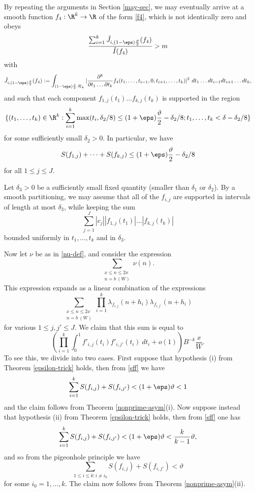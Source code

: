 By repeating the arguments in Section \ref{may-sec}, we may eventually arrive at a smooth function $f_4: \R^k \to \R$ of the form \eqref{f4}, which is not identically zero and obeys 
\begin{equation}\label{f4-ratio}
\frac{\sum_{i=1}^k \tilde J_{i,(1-\eps) \frac{\vartheta}{2}}(f_4)}{\tilde I(f_4)} > m
\end{equation}
with
$$ \tilde J_{i, (1-\eps) \frac{\vartheta}{2}}(f_4) := \int_{(1-\eps) \frac{\vartheta}{2} \cdot {\mathcal R}_k} |\frac{\partial^k}{\partial t_1 \dots \partial t_k} f_4(t_1,\dots,t_{i-1}, 0, t_{i+1}, \dots, t_k)|^2\ dt_1 \dots dt_{i-1} dt_{i+1} \dots dt_k,$$
and such that each component $f_{1,j}(t_1) \dots f_{k,j}(t_k)$ is supported in the region
$$ \{ (t_1,\dots,t_k) \in \R^k: \sum_{i=1}^k \max(t_i, \delta_2/8) \leq (1+\eps) \frac{\vartheta}{2} - \delta_2/8; t_1,\dots,t_k < \delta - \delta_2/8 \}$$
for some sufficiently small $\delta_2>0$.  In particular, we have
\begin{equation}\label{sff}
S(f_{1,j}) + \dots + S(f_{k,j}) \leq (1+\eps) \frac{\vartheta}{2} - \delta_2/8
\end{equation}
for all $1 \leq j \leq J$.  

Let $\delta_3 > 0$ be a sufficiently small fixed quantity (smaller than $\delta_1$ or $\delta_2$).  By a smooth partitioning, we may assume that all of the $f_{i,j}$ are supported in intervals of length at most $\delta_3$, while keeping the sum
\begin{equation}\label{abs-sum}
\sum_{j=1}^J |c_j| |f_{1,j}(t_1)| \dots |f_{k,j}(t_k)|
\end{equation}
bounded uniformly in $t_1,\dots,t_k$ and in $\delta_3$.

Now let $\nu$ be as in \eqref{nu-def}, and consider the expression
$$ \sum_{\substack{x \leq n \leq 2x\\ n = b\ (W)}} \nu(n).$$
This expression expands as a linear combination of the expressions
$$ \sum_{\substack{x \leq n \leq 2x\\ n = b\ (W)}} \prod_{i=1}^k \lambda_{f_{i,j}}(n+h_i) \lambda_{f_{i,j'}}(n+h_i)$$
for various $1 \leq j,j' \leq J$.  We claim that this sum is equal to
$$ (\prod_{i=1}^k \int_0^1 f'_{i,j}(t_i) f'_{i,j'}(t_i)\ dt_i + o(1)) B^{-k} \frac{x}{W}.$$
To see this, we divide into two cases.  First suppose that hypothesis (i) from Theorem \ref{epsilon-trick} holds, then from \eqref{sff} we have
$$ \sum_{i=1}^k S(f_{i,j}) + S(f_{i,j'}) < (1+\eps) \vartheta < 1$$
and the claim follows from Theorem \ref{nonprime-asym}(i).  Now suppose instead that hypothesis (ii) from Theorem \ref{epsilon-trick} holds, then from \eqref{sff} one has
$$ \sum_{i=1}^k S(f_{i,j}) + S(f_{i,j'}) < (1+\eps) \vartheta < \frac{k}{k-1} \vartheta,$$
and so from the pigeonhole principle we have
$$ \sum_{1 \leq i \leq k: i \neq i_0} S(f_{i,j}) + S(f_{i,j'}) < \vartheta$$
for some $i_0 = 1,\ldots,k$.  The claim now follows from Theorem \ref{nonprime-asym}(ii).

